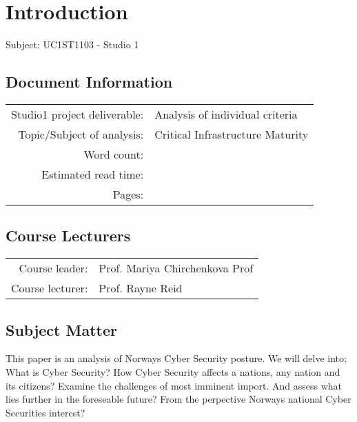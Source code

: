 \section{Introduction}

{\huge{Subject: UC1ST1103 - Studio 1}}

\subsection{Document Information}

\begin{table}[h]
    \renewcommand{\arraystretch}{2}
    \begin{tabular}{r|l}
        Studio1 project deliverable: & Analysis of individual criteria \\
        Topic/Subject of analysis: & Critical Infrastructure Maturity\\
        Word count: & {\color{red}{N/A}}\\
        Estimated read time: & {\color{red}{HH:MM}} \\
        Pages: & \pageref{LastPage} \\
    \end{tabular}
    \renewcommand{\arraystretch}{1}
    
    \subsection{Course Lecturers}
    
    \renewcommand{\arraystretch}{2}
    \begin{tabular}{r|l}
        Course leader: & Prof. Mariya Chirchenkova Prof \\
        Course lecturer: & Prof. Rayne Reid \\
    \end{tabular}
    \renewcommand{\arraystretch}{1}
        
\end{table}

\subsection{Subject Matter}

This paper is an analysis of Norways Cyber Security posture. We will delve into; What is Cyber Security? How Cyber Security affects a nations, any nation and its citizens? Examine the challenges of most imminent import. And assess what lies further in the foreseable future? From the perpective Norways national Cyber Securities interest?

